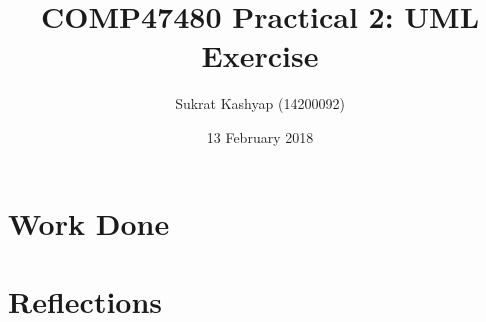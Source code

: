 \documentclass[12pt]{article}
\title{\vspace{-3.0cm}COMP47480 Practical 2: UML Exercise}
\author{Sukrat Kashyap (14200092)}
\date{13 February 2018}
\begin{document}
\maketitle

\section{Work Done}


\section{Reflections}
\end{document}
